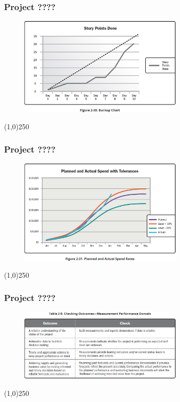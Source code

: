 \begin{frame}
\frametitle{Project ????}
 \begin{figure}
    \centering
        \includegraphics[width = 8cm]{../images/guide/Fig2-30.jpg}
    \label{guidefig:2-30}
 \end{figure}
\end{frame}
\begin{center}\line(1,0){250}\end{center}

\begin{frame}
\frametitle{Project ????}
 \begin{figure}
    \centering
        \includegraphics[width = 8cm]{../images/guide/Fig2-31.jpg}
    \label{guidefig:2-31}
 \end{figure}
\end{frame}
\begin{center}\line(1,0){250}\end{center}


\begin{frame}
\frametitle{Project ????}
 \begin{figure}
    \centering
        \includegraphics[width = 8cm]{../images/guide/Table2-9.jpg}
    \label{guideTable:2-9}
 \end{figure}
\end{frame}
\begin{center}\line(1,0){250}\end{center}




